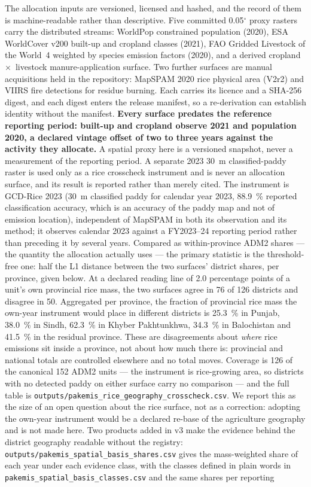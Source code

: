 \documentclass[essd]{copernicus}
\begin{document}
The allocation inputs are versioned, licensed and hashed, and the record of them is machine-readable rather than descriptive. Five committed 0.05$^{\circ}$ proxy rasters carry the distributed streams: WorldPop constrained population (2020), ESA WorldCover v200 built-up and cropland classes (2021), FAO Gridded Livestock of the World~4 weighted by species emission factors (2020), and a derived cropland~$\times$~livestock manure-application surface. Two further surfaces are manual acquisitions held in the repository: MapSPAM 2020 rice physical area (V2r2) and VIIRS fire detections for residue burning. Each carries its licence and a SHA-256 digest, and each digest enters the release manifest, so a re-derivation can establish identity without the manifest. \textbf{Every surface predates the reference reporting period: built-up and cropland observe 2021 and population 2020, a declared vintage offset of two to three years against the activity they allocate.} A spatial proxy here is a versioned snapshot, never a measurement of the reporting period. A separate 2023 30~m classified-paddy raster is used only as a rice crosscheck instrument and is never an allocation surface, and its result is reported rather than merely cited. The instrument is GCD-Rice 2023 (30~m classified paddy for calendar year 2023, \SI{88.9}{\percent} reported classification accuracy, which is an accuracy of the paddy map and not of emission location), independent of MapSPAM in both its observation and its method; it observes calendar 2023 against a FY2023--24 reporting period rather than preceding it by several years. Compared as within-province ADM2 shares --- the quantity the allocation actually uses --- the primary statistic is the threshold-free one: half the L1 distance between the two surfaces' district shares, per province, given below. At a declared reading line of \num{2.0} percentage points of a unit's own provincial rice mass, the two surfaces agree in \num{76} of \num{126} districts and disagree in \num{50}. Aggregated per province, the fraction of provincial rice mass the own-year instrument would place in different districts is \SI{25.3}{\percent} in Punjab, \SI{38.0}{\percent} in Sindh, \SI{62.3}{\percent} in Khyber Pakhtunkhwa, \SI{34.3}{\percent} in Balochistan and \SI{41.5}{\percent} in the residual province. These are disagreements about \emph{where} rice emissions sit inside a province, not about how much there is: provincial and national totals are controlled elsewhere and no total moves. Coverage is \num{126} of the canonical \num{152} ADM2 units --- the instrument is rice-growing area, so districts with no detected paddy on either surface carry no comparison --- and the full table is \texttt{outputs/pakemis\_rice\_geography\_crosscheck.csv}. We report this as the size of an open question about the rice surface, not as a correction: adopting the own-year instrument would be a declared re-base of the agriculture geography and is not made here. Two products added in v3 make the evidence behind the district geography readable without the registry: \texttt{outputs/pakemis\_spatial\_basis\_shares.csv} gives the mass-weighted share of each year under each evidence class, with the classes defined in plain words in \texttt{pakemis\_spatial\_basis\_classes.csv} and the same shares per reporting 
\end{document}
